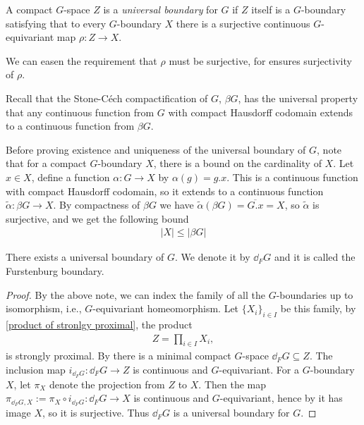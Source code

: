 \begin{definition}
A compact $G$-space $Z$ is a \emph{universal boundary} for $G$ if $Z$ itself is a $G$-boundary satisfying that to every $G$-boundary $X$ there is a surjective continuous $G$-equivariant map $\rho \colon Z \to X$.
\end{definition}
\begin{remark}\label{remark unique}
We can easen the requirement that $\rho$ must be surjective, for  ensures surjectivity of $\rho$.
\end{remark}

\noindent Recall that the Stone-Céch compactification of $G$, $\beta G$, has the universal property that any continuous function from $G$ with compact Hausdorff codomain extends to a continuous function from $\beta G$.

Before proving existence and uniqueness of the universal boundary of $G$, note that for a compact $G$-boundary $X$, there is a bound on the cardinality of $X$. Let $x \in X$, define a function $\alpha \colon G \to X$ by $\alpha(g)=g.x$.  This is a continuous function with compact Hausdorff codomain, so it extends to a continuous function $\tilde{\alpha} \colon \beta G \to X$. By compactness of $\beta G$ we have $\tilde{\alpha}(\beta G)= \overline{G.x}=X$, so $\tilde{\alpha}$ is surjective, and we get the following bound 
\begin{align*}
|X|\leq |\beta G|
\end{align*}

\begin{theorem}\label{existence fursten}
There exists a universal boundary of $G$. We denote it by $\dd_F G$ and it is called the Furstenburg boundary.
\begin{proof}
By the above note, we can index the family of all the $G$-boundaries up to isomorphism, i.e., $G$-equivariant homeomorphism. Let $\{X_i\}_{i \in I}$ be this family, by \ref{product of stronlgy proximal}, the product
\begin{align*}
Z=\prod_{i \in I} X_i,
\end{align*}
is strongly proximal. By  there is a minimal compact $G$-space $\dd_F G \subseteq Z$. The inclusion map $i_{\dd_F G} \colon \dd_F G \to Z$ is continuous and $G$-equivariant. For a $G$-boundary $X$, let $\pi_X$ denote the projection from $Z$ to $X$. Then the map $\pi_{\dd_F G,X}:=\pi_X \circ i_{\dd_F G} \colon \dd_F G \to X$ is continuous and $G$-equivariant, hence by  it has image $X$, so it is surjective. Thus $\dd_F G$ is a universal boundary for $G$.
\end{proof}
\end{theorem}

